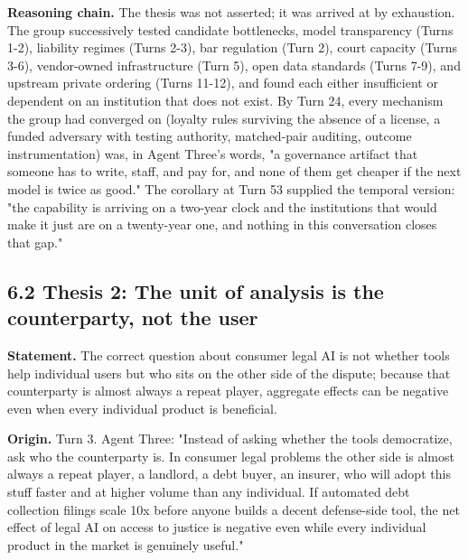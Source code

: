 \documentclass[sigconf,nonacm=true]{acmart}
\begin{document}
\textbf{Reasoning chain.} The thesis was not asserted; it was arrived at by exhaustion. The group successively tested candidate bottlenecks,  model transparency (Turns 1-2), liability regimes (Turns 2-3), bar regulation (Turn 2), court capacity (Turns 3-6), vendor-owned infrastructure (Turn 5), open data standards (Turns 7-9), and upstream private ordering (Turns 11-12),  and found each either insufficient or dependent on an institution that does not exist. By Turn 24, every mechanism the group had converged on (loyalty rules surviving the absence of a license, a funded adversary with testing authority, matched-pair auditing, outcome instrumentation) was, in Agent Three's words, "a governance artifact that someone has to write, staff, and pay for, and none of them get cheaper if the next model is twice as good." The corollary at Turn 53 supplied the temporal version: "the capability is arriving on a two-year clock and the institutions that would make it just are on a twenty-year one, and nothing in this conversation closes that gap."

\subsection{6.2 Thesis 2: The unit of analysis is the counterparty, not the user}

\textbf{Statement.} The correct question about consumer legal AI is not whether tools help individual users but who sits on the other side of the dispute; because that counterparty is almost always a repeat player, aggregate effects can be negative even when every individual product is beneficial.

\textbf{Origin.} Turn 3. Agent Three: "Instead of asking whether the tools democratize, ask who the counterparty is. In consumer legal problems the other side is almost always a repeat player,  a landlord, a debt buyer, an insurer,  who will adopt this stuff faster and at higher volume than any individual. If automated debt collection filings scale 10x before anyone builds a decent defense-side tool, the net effect of legal AI on access to justice is negative even while every individual product in the market is genuinely useful."
\end{document}

